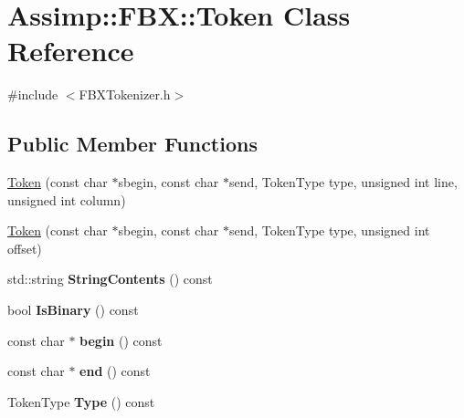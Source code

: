 \hypertarget{class_assimp_1_1_f_b_x_1_1_token}{\section{Assimp\+:\+:F\+B\+X\+:\+:Token Class Reference}
\label{class_assimp_1_1_f_b_x_1_1_token}
}


{\ttfamily \#include $<$F\+B\+X\+Tokenizer.\+h$>$}

\subsection*{Public Member Functions}
\begin{DoxyCompactItemize}
\item 
\hyperlink{class_assimp_1_1_f_b_x_1_1_token_a8d71d69462be678beed557a5a0aaa272}{Token} (const char $\ast$sbegin, const char $\ast$send, Token\+Type type, unsigned int line, unsigned int column)
\item 
\hyperlink{class_assimp_1_1_f_b_x_1_1_token_a361e4f55ab9665ce237423d3e0c0e7bc}{Token} (const char $\ast$sbegin, const char $\ast$send, Token\+Type type, unsigned int offset)
\item 
\hypertarget{class_assimp_1_1_f_b_x_1_1_token_adfb110c93ab7eb1d4105a8e09d4eef2e}{std\+::string {\bfseries String\+Contents} () const }\label{class_assimp_1_1_f_b_x_1_1_token_adfb110c93ab7eb1d4105a8e09d4eef2e}

\item 
\hypertarget{class_assimp_1_1_f_b_x_1_1_token_a74c40d58c807c5254efe74ded198987f}{bool {\bfseries Is\+Binary} () const }\label{class_assimp_1_1_f_b_x_1_1_token_a74c40d58c807c5254efe74ded198987f}

\item 
\hypertarget{class_assimp_1_1_f_b_x_1_1_token_ae2c18d12543b11b5b600a8d7f1584652}{const char $\ast$ {\bfseries begin} () const }\label{class_assimp_1_1_f_b_x_1_1_token_ae2c18d12543b11b5b600a8d7f1584652}

\item 
\hypertarget{class_assimp_1_1_f_b_x_1_1_token_a43e2c31d3fdb2f708712d82a3c577852}{const char $\ast$ {\bfseries end} () const }\label{class_assimp_1_1_f_b_x_1_1_token_a43e2c31d3fdb2f708712d82a3c577852}

\item 
\hypertarget{class_assimp_1_1_f_b_x_1_1_token_a1de882de2b3396531a2da70a325c8ef0}{Token\+Type {\bfseries Type} () const }\label{class_assimp_1_1_f_b_x_1_1_token_a1de882de2b3396531a2da70a325c8ef0}


\end{DoxyCompactItemize}
